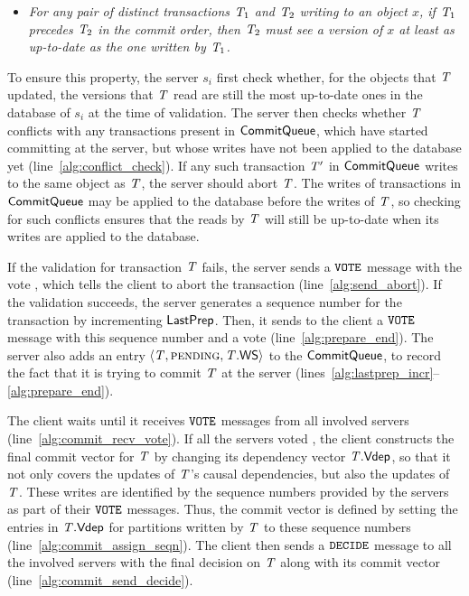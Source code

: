 \begin{itemize}
    \item \emph{For any pair of distinct transactions $\mathit{T}_1$ and $\mathit{T}_2$ writing to an object $x$, if $\mathit{T}_1$ precedes $\mathit{T}_2$ in the commit order, then $\mathit{T}_2$ must see a version of $x$ at least as up-to-date as the one written by $\mathit{T}_1$.}
\end{itemize}

To ensure this property, the server $s_i$ first check whether, for the objects that $\mathit{T}$ updated, the versions that $\mathit{T}$ read are still the most up-to-date ones in the database of $s_i$ at the time of validation. The server then checks whether $\mathit{T}$ conflicts with any transactions present in $\mathsf{CommitQueue}$, which have started committing at the server, but whose writes have not been applied to the database yet (line~\ref{alg:conflict_check}). If any such transaction $\mathit{T}'$ in $\mathsf{CommitQueue}$ writes to the same object as $\mathit{T}$, the server should abort $\mathit{T}$. The writes of transactions in $\mathsf{CommitQueue}$ may be applied to the database before the writes of $\mathit{T}$, so checking for such conflicts ensures that the reads by $\mathit{T}$ will still be up-to-date when its writes are applied to the database.

If the validation for transaction $\mathit{T}$ fails, the server sends a ${\tt VOTE}$ message with the vote \abort, which tells the client to abort the transaction (line~\ref{alg:send_abort}). If the validation succeeds, the server generates a sequence number for the transaction by incrementing $\mathsf{LastPrep}$. Then, it sends to the client a ${\tt VOTE}$ message with this sequence number and a vote \commit (line~\ref{alg:prepare_end}). The server also adds an entry $\langle \mathit{T}, \text{\sc pending}, \mathit{T}.\mathsf{WS} \rangle$ to the $\mathsf{CommitQueue}$, to record the fact that it is trying to commit $\mathit{T}$ at the server (lines~\ref{alg:lastprep_incr}--\ref{alg:prepare_end}).

The client waits until it receives ${\tt VOTE}$ messages from all involved servers (line~\ref{alg:commit_recv_vote}). If all the servers voted \commit, the client constructs the final commit vector for $\mathit{T}$ by changing its dependency vector $\mathit{T}.\mathsf{Vdep}$, so that it not only covers the updates of $\mathit{T}$'s causal dependencies, but also the updates of $\mathit{T}$. These writes are identified by the sequence numbers provided by the servers as part of their ${\tt VOTE}$ messages. Thus, the commit vector is defined by setting the entries in $\mathit{T}.\mathsf{Vdep}$ for partitions written by $\mathit{T}$ to these sequence numbers (line~\ref{alg:commit_assign_seqn}). The client then sends a ${\tt DECIDE}$ message to all the involved servers with the final decision on $\mathit{T}$ along with its commit vector (line~\ref{alg:commit_send_decide}).

